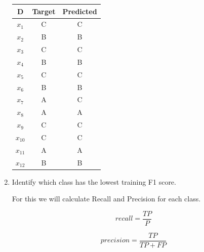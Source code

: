 \documentclass{article}
\begin{document}
\begin{enumerate}[leftmargin=\labelsep]
\begin{minipage}{0.50\textwidth}
  \begin{table}[H]
    \centering
    \begin{tabular}{ccc}
      D & Target  & Predicted \\ \midrule
      $x_1$     & C & C \\
      $x_2$     & B & B \\
      $x_3$     & C & C \\
      $x_4$     & B & B \\
      $x_5$     & C & C \\
      $x_6$     & B & B \\
      $x_7$     & A & C \\
      $x_8$     & A & A \\
      $x_9$     & C & C \\
      $x_{10}$  & C & C \\
      $x_{11}$  & A & A \\
      $x_{12}$  & B & B \\
    \end{tabular}
  \end{table}
\end{minipage}
\vspace{10pt}

\item Identify which class has the lowest training F1 score.

For this we will calculate Recall and Precision for each class.

\begin{equation*}
  recall = \frac{TP}{P}
\end{equation*}

\begin{equation*}
  precision = \frac{TP}{TP + FP}
\end{equation*}


\end{enumerate}
\end{document}
